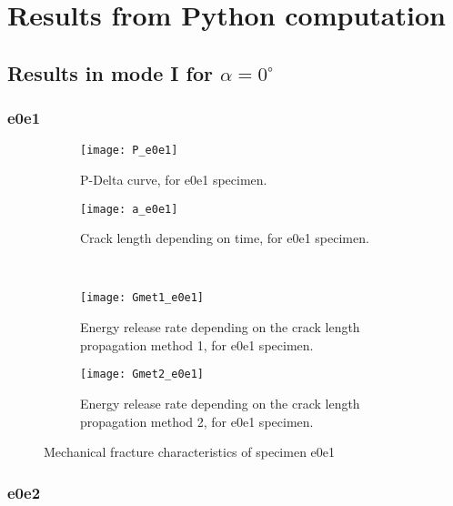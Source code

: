 
\chapter{Results from Python computation} %

\label{Appendix1} %


\section{Results in mode I for $\alpha=0 ^\circ$}

\subsection{e0e1}

\begin{figure}[H]
	\centering
	\begin{subfigure}{0.48\linewidth}
		\centering
		\texttt{[image: P\_e0e1]}
		\decoRule
		\caption{P-Delta curve, for e0e1 specimen.}
		\label{fig:P_e0e1}
	\end{subfigure}
	\hfill 
	\begin{subfigure}{0.48\linewidth}
		\centering
		\texttt{[image: a\_e0e1]}
		\decoRule
		\caption{Crack length depending on time, for e0e1 specimen.}
		\label{fig:a_e0e1}
	\end{subfigure}
	\hfill\\
	\begin{subfigure}{0.48\linewidth}
		\centering
		\texttt{[image: Gmet1\_e0e1]}
		\decoRule
		\caption{Energy release rate depending on the crack length propagation method 1, for e0e1 specimen.}
		\label{fig:Gmet1_e0e1}
	\end{subfigure}
	\hfill
	\begin{subfigure}{0.48\linewidth}
		\centering
		\texttt{[image: Gmet2\_e0e1]}
		\decoRule
		\caption{Energy release rate depending on the crack length propagation method 2, for e0e1 specimen.}
		\label{fig:Gmet2_e0e1}
	\end{subfigure}
	\caption{Mechanical fracture characteristics of specimen e0e1}
	\label{E1o_a}
\end{figure}

\subsection{e0e2}

